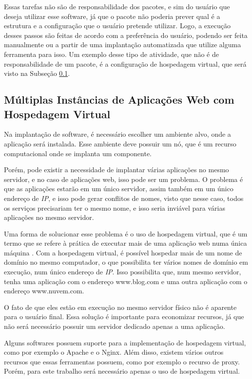 Essas tarefas não são de responsabilidade dos pacotes, e sim do usuário que deseja utilizar esse
software, já que o pacote não poderia prever qual é a estrutura e a configuração
que o usuário pretende utilizar. Logo, a execução desses passos são feitas de
acordo com a preferência do usuário, podendo ser feita manualmente ou a partir
de uma implantação automatizada que utilize alguma ferramenta para isso. Um exemplo
desse tipo de atividade, que não é de responsabilidade de um pacote, é a configuração
de hospedagem virtual, que será visto na Subseção \ref{sub:multiplas}.

\subsection{Múltiplas Instâncias de Aplicações Web com Hospedagem Virtual}
\label{sub:multiplas}
Na implantação de software, é necessário escolher um ambiente alvo, onde a aplicação
será instalada. Esse ambiente deve possuir um nó, que é um recurso computacional
onde se implanta um componente. 

Porém, pode existir a necessidade de implantar várias aplicações no mesmo servidor, e no caso
de aplicações web, isso pode ser um problema. O problema é que as aplicações estarão em um
único servidor, assim também em um único endereço de \textit{IP}, e isso pode gerar
conflitos de nomes, visto que nesse caso, todos os serviços precisariam ter o mesmo
nome, e isso seria inviável para várias aplicações no mesmo servidor.

Uma forma de solucionar esse problema é o uso de hospedagem virtual, que é um 
termo que se refere à prática de executar mais de uma aplicação web numa única 
máquina \cite{apachvh}. Com a hospedagem virtual, é possível
hospedar mais de um nome de domínio no mesmo computador, o que possibilita ter
vários nomes de domínio em execução, num único endereço de \textit{IP}. Isso
possibilita que, num mesmo servidor, tenha uma aplicação com o endereço
 www.blog.com e uma outra aplicação com o endereço www.nuvem.com. 

O fato de que eles estão em execução no mesmo servidor físico não é aparente 
para o usuário final. Essa solução é importante para economizar recursos, 
já que não será necessário possuir um servidor dedicado apenas a uma aplicação.

Alguns softwares possuem suporte para a implementação de hospedagem virtual, como por
exemplo o Apache e o Nginx. Além disso, existem vários
outros recursos que essas ferramentas possuem, como por exemplo o recurso de proxy.
Porém, para este trabalho será necessário apenas o uso de hospedagem virtual.

